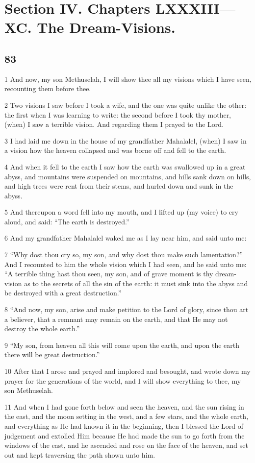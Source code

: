 \part {Section IV. Chapters LXXXIII—XC. The Dream-Visions.}

\chapter{83}

\par 1 And now, my son Methuselah, I will show thee all my visions which I have seen, recounting them before thee.
\par 2 Two visions I saw before I took a wife, and the one was quite unlike the other: the first when I was learning to write: the second before I took thy mother, (when) I saw a terrible vision. And regarding them I prayed to the Lord.
\par 3 I had laid me down in the house of my grandfather Mahalalel, (when) I saw in a vision how the heaven collapsed and was borne off and fell to the earth.
\par 4 And when it fell to the earth I saw how the earth was swallowed up in a great abyss, and mountains were suspended on mountains, and hills sank down on hills, and high trees were rent from their stems, and hurled down and sunk in the abyss.
\par 5 And thereupon a word fell into my mouth, and I lifted up (my voice) to cry aloud, and said: “The earth is destroyed.”
\par 6 And my grandfather Mahalalel waked me as I lay near him, and said unto me:
\par 7 “Why dost thou cry so, my son, and why dost thou make such lamentation?” And I recounted to him the whole vision which I had seen, and he said unto me: “A terrible thing hast thou seen, my son, and of grave moment is thy dream-vision as to the secrets of all the sin of the earth: it must sink into the abyss and be destroyed with a great destruction.”
\par 8 “And now, my son, arise and make petition to the Lord of glory, since thou art a believer, that a remnant may remain on the earth, and that He may not destroy the whole earth.”
\par 9 “My son, from heaven all this will come upon the earth, and upon the earth there will be great destruction.”
\par 10 After that I arose and prayed and implored and besought, and wrote down my prayer for the generations of the world, and I will show everything to thee, my son Methuselah.
\par 11 And when I had gone forth below and seen the heaven, and the sun rising in the east, and the moon setting in the west, and a few stars, and the whole earth, and everything as He had known it in the beginning, then I blessed the Lord of judgement and extolled Him because He had made the sun to go forth from the windows of the east, and he ascended and rose on the face of the heaven, and set out and kept traversing the path shown unto him.

